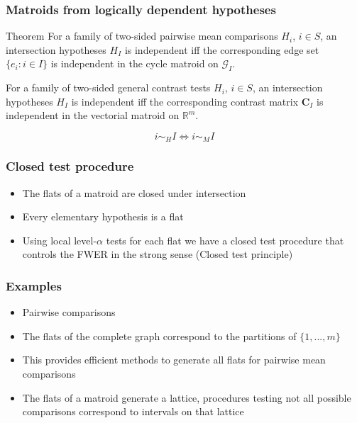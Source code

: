 \documentclass[bigger]{beamer}
\newcommand{\bs}[1]{\bm{#1}}
\begin{document}
\begin{frame}
\frametitle{Matroids from logically dependent hypotheses}

  \begin{block}{Theorem}
    For a family of two-sided pairwise mean comparisons $H_i$, $i \in
    S$, an intersection hypotheses $H_I$ is independent iff the
    corresponding edge set $\{e_i:i \in I\}$ is independent in the
    cycle matroid on $\mathscr{G}_I$.  

For a family of two-sided
    general contrast tests $H_i$, $i \in S$, an intersection
    hypotheses $H_I$ is independent iff the corresponding contrast
    matrix $\bs{C}_I$ is independent in the vectorial matroid on
    $\mathbb{R}^m$.

    \begin{displaymath}
      i \sim_H I \Leftrightarrow i \sim_M I
    \end{displaymath}
  \end{block}


\end{frame}



\begin{frame}
\frametitle{Closed test procedure}
\begin{itemize}

\item The flats of a matroid are closed under intersection

\item Every elementary hypothesis is a flat

\item Using local level-$\alpha$ tests for each flat we have a closed test procedure that controls the FWER in the strong sense (Closed test principle)

\end{itemize} %
\end{frame}



\begin{frame}
\frametitle{Examples}
\begin{itemize}

\item Pairwise comparisons

\item The flats of the complete graph correspond to the partitions of
  $\{1,...,m\}$
\item This provides efficient methods to generate all flats for
  pairwise mean comparisons \cite{er1988fast,knuth2005art,kokosinski2006new}

\item The flats of a matroid generate a lattice, procedures testing not all possible comparisons correspond to intervals on that lattice

\end{itemize} %
\end{frame}
\end{document}
